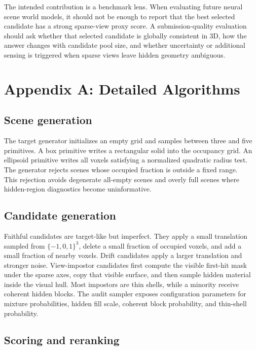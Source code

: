 \documentclass{article}
\begin{document}
The intended contribution is a benchmark lens. When evaluating future neural
scene world models, it should not be enough to report that the best selected
candidate has a strong sparse-view proxy score. A submission-quality evaluation
should ask whether that selected candidate is globally consistent in 3D, how
the answer changes with candidate pool size, and whether uncertainty or
additional sensing is triggered when sparse views leave hidden geometry
ambiguous.

\appendix

\section{Appendix A: Detailed Algorithms}

\subsection{Scene generation}

The target generator initializes an empty grid and samples between three and
five primitives. A box primitive writes a rectangular solid into the occupancy
grid. An ellipsoid primitive writes all voxels satisfying a normalized quadratic
radius test. The generator rejects scenes whose occupied fraction is outside a
fixed range. This rejection avoids degenerate all-empty scenes and overly full
scenes where hidden-region diagnostics become uninformative.

\subsection{Candidate generation}

Faithful candidates are target-like but imperfect. They apply a small
translation sampled from $\{-1,0,1\}^3$, delete a small fraction of occupied
voxels, and add a small fraction of nearby voxels. Drift candidates apply a
larger translation and stronger noise. View-impostor candidates first compute
the visible first-hit mask under the sparse axes, copy that visible surface,
and then sample hidden material inside the visual hull. Most impostors are thin
shells, while a minority receive coherent hidden blocks. The audit sampler exposes
configuration parameters for mixture probabilities, hidden fill scale, coherent
block probability, and thin-shell probability.

\subsection{Scoring and reranking}
\end{document}
